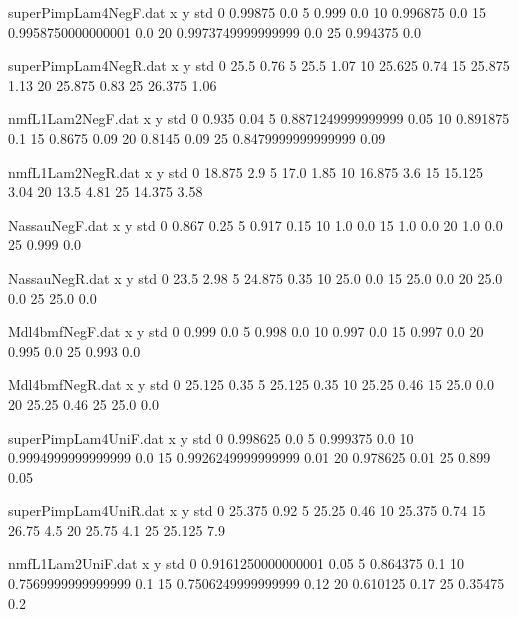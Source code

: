\begin{filecontents}{superPimpLam4NegF.dat}
x y std
0 0.99875 0.0
5 0.999 0.0
10 0.996875 0.0
15 0.9958750000000001 0.0
20 0.9973749999999999 0.0
25 0.994375 0.0
\end{filecontents}
\begin{filecontents}{superPimpLam4NegR.dat}
x y std
0 25.5 0.76
5 25.5 1.07
10 25.625 0.74
15 25.875 1.13
20 25.875 0.83
25 26.375 1.06
\end{filecontents}
\begin{filecontents}{nmfL1Lam2NegF.dat}
x y std
0 0.935 0.04
5 0.8871249999999999 0.05
10 0.891875 0.1
15 0.8675 0.09
20 0.8145 0.09
25 0.8479999999999999 0.09
\end{filecontents}
\begin{filecontents}{nmfL1Lam2NegR.dat}
x y std
0 18.875 2.9
5 17.0 1.85
10 16.875 3.6
15 15.125 3.04
20 13.5 4.81
25 14.375 3.58
\end{filecontents}
\begin{filecontents}{NassauNegF.dat}
x y std
0 0.867 0.25
5 0.917 0.15
10 1.0 0.0
15 1.0 0.0
20 1.0 0.0
25 0.999 0.0
\end{filecontents}
\begin{filecontents}{NassauNegR.dat}
x y std
0 23.5 2.98
5 24.875 0.35
10 25.0 0.0
15 25.0 0.0
20 25.0 0.0
25 25.0 0.0
\end{filecontents}
\begin{filecontents}{Mdl4bmfNegF.dat}
x y std
0 0.999 0.0
5 0.998 0.0
10 0.997 0.0
15 0.997 0.0
20 0.995 0.0
25 0.993 0.0
\end{filecontents}
\begin{filecontents}{Mdl4bmfNegR.dat}
x y std
0 25.125 0.35
5 25.125 0.35
10 25.25 0.46
15 25.0 0.0
20 25.25 0.46
25 25.0 0.0
\end{filecontents}
\begin{filecontents}{superPimpLam4UniF.dat}
x y std
0 0.998625 0.0
5 0.999375 0.0
10 0.9994999999999999 0.0
15 0.9926249999999999 0.01
20 0.978625 0.01
25 0.899 0.05
\end{filecontents}
\begin{filecontents}{superPimpLam4UniR.dat}
x y std
0 25.375 0.92
5 25.25 0.46
10 25.375 0.74
15 26.75 4.5
20 25.75 4.1
25 25.125 7.9
\end{filecontents}
\begin{filecontents}{nmfL1Lam2UniF.dat}
x y std
0 0.9161250000000001 0.05
5 0.864375 0.1
10 0.7569999999999999 0.1
15 0.7506249999999999 0.12
20 0.610125 0.17
25 0.35475 0.2
\end{filecontents}
